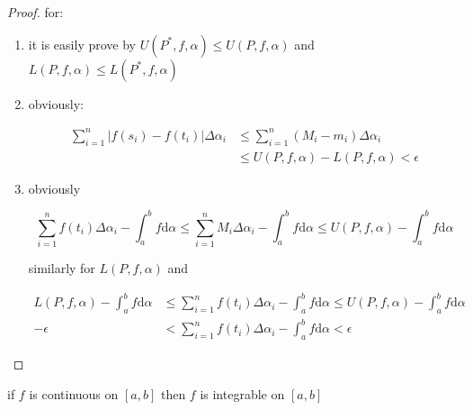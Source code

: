 \begin{proof}
    for:
    
    \begin{enumerate}
        \item it is easily prove by $U(P^*,f,\alpha) \le U(P,f,\alpha)$ and $L(P,f,\alpha) \le L(P^*,f,\alpha)$

        \item obviously:

        \begin{align*}
            \sum_{i=1}^{n}\left| f(s_i) - f(t_i) \right| \Delta \alpha_i &\le \sum_{i=1}^{n}\left(M_i - m_i \right)\Delta \alpha_i \\
            & \le U(P,f, \alpha) - L(P,f, \alpha) < \epsilon
        \end{align*}

        \item obviously
        
        \[
             \sum_{i=1}^{n} f(t_i)  \Delta \alpha_i - \int_a^b f \mathrm{d}\alpha  \le \sum_{i=1}^{n} M_i  \Delta \alpha_i - \int_a^b f \mathrm{d}\alpha \le U(P,f,\alpha) - \int_a^b f \mathrm{d}\alpha
        \]

        similarly for $L(P,f,\alpha)$ and

        \begin{align*}
 L(P,f,\alpha) - \int_a^b f \mathrm{d}\alpha & \le \sum_{i=1}^{n} f(t_i)  \Delta \alpha_i - \int_a^b f \mathrm{d}\alpha  \le U(P,f,\alpha) - \int_a^b f \mathrm{d}\alpha \\
-\epsilon & < \sum_{i=1}^{n} f(t_i)  \Delta \alpha_i - \int_a^b f \mathrm{d}\alpha  < \epsilon
        \end{align*}
    \end{enumerate}
\end{proof}

\begin{thm}
    if $f$ is continuous on $[a,b]$ then $f$ is integrable on $[a,b]$
\end{thm}

